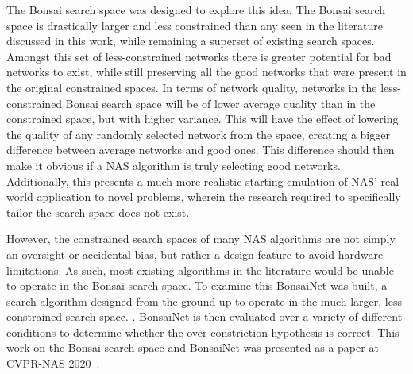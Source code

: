 The Bonsai search space was designed to explore this idea. The Bonsai search space is drastically larger and less constrained
than any seen in the literature discussed in this work, while remaining a superset of existing search spaces. Amongst this set
of less-constrained networks there is greater potential for bad networks to exist, while still preserving all the good networks that were present
in the original constrained spaces. In terms of network quality, networks in the less-constrained Bonsai search space
will be of lower average quality than in the constrained space, but with higher variance. This will have the effect of
lowering the quality of any randomly selected network from the space, creating a bigger difference between average networks
and good ones. This difference should then make it obvious if a NAS algorithm is truly selecting good networks. Additionally,
this presents a much more realistic starting emulation of NAS' real world application to novel problems,
wherein the research required to specifically tailor the search space does not exist.

However, the constrained search spaces of many NAS algorithms are not simply an oversight or accidental bias, but rather a design feature
to avoid hardware limitations. As such, most existing algorithms in the literature would be unable to operate in the Bonsai search space.
To examine this BonsaiNet was built, a search algorithm designed from the ground up to operate in the much larger,
less-constrained search space. . BonsaiNet is then evaluated over a variety
of different conditions to determine whether the over-constriction hypothesis is correct. This work on the
Bonsai search space and BonsaiNet was presented as a paper at CVPR-NAS 2020~\citep{geada2020}.

